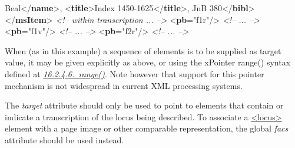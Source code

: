 \begin{shaded}
\hspace*{1em}Beal{</\textbf{name}>}, {<\textbf{title}>}Index 1450-1625{</\textbf{title}>}, JnB 380{</\textbf{bibl}>}\mbox{}\newline 
{</\textbf{msItem}>}\mbox{}\newline 
\textit{<!-- within transcription ... -->}\mbox{}\newline 
{<\textbf{pb}\hspace*{1em}{xml:id}="{f1r}"/>}\mbox{}\newline 
\textit{<!-- ... -->}\mbox{}\newline 
{<\textbf{pb}\hspace*{1em}{xml:id}="{f1v}"/>}\mbox{}\newline 
\textit{<!-- ... -->}\mbox{}\newline 
{<\textbf{pb}\hspace*{1em}{xml:id}="{f2r}"/>}\mbox{}\newline 
\textit{<!-- ... -->}\end{shaded}\egroup\par \par
When (as in this example) a sequence of elements is to be supplied as target value, it may be given explicitly as above, or using the xPointer range() syntax defined at \textit{\hyperref[SATSRN]{16.2.4.6.\ range()}}. Note however that support for this pointer mechanism is not widespread in current XML processing systems.\par
The {\itshape target} attribute should only be used to point to elements that contain or indicate a transcription of the locus being described. To associate a \hyperref[TEI.locus]{<locus>} element with a page image or other comparable representation, the global {\itshape facs} attribute should be used instead.
